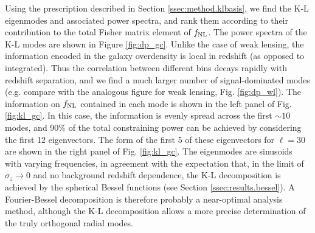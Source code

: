 \documentclass[twocolumn,amsfont,amssymb,amsmath, showpacs,balancelastpage, nofootinbib]{revtex4-1}
\begin{document}
    Using the prescription described in Section \ref{ssec:method.klbasis}, we find the K-L eigenmodes and associated power spectra, and rank them according to their contribution to the total Fisher matrix element of $f_{\rm NL}$. The power spectra of the K-L modes are shown in Figure \ref{fig:dp_gc}. Unlike the case of weak lensing, the information encoded in the galaxy overdensity is local in redshift (as opposed to integrated). Thus the correlation between different bins decays rapidly with redshift separation, and we find a much larger number of signal-dominated modes (e.g. compare with the analogous figure for weak lensing, Fig. \ref{fig:dp_wl}). The information on $f_{\rm NL}$ contained in each mode is shown in the left panel of Fig. \ref{fig:kl_gc}. In this case, the information is evenly spread across the first $\sim10$ modes, and 90\% of the total constraining power can be achieved by considering the first 12 eigenvectors. The form of the first 5 of these eigenvectors for $\ell=30$ are shown in the right panel of Fig. \ref{fig:kl_gc}. The eigenmodes are sinusoids with varying frequencies, in agreement with the expectation that, in the limit of $\sigma_z\rightarrow0$ and no background redshift dependence, the K-L decomposition is achieved by the spherical Bessel functions (see Section \ref{ssec:results.bessel}). A Fourier-Bessel decomposition is therefore probably a near-optimal analysis method, although the K-L decomposition allows a more precise determination of the truly orthogonal radial modes.
    
\end{document}
